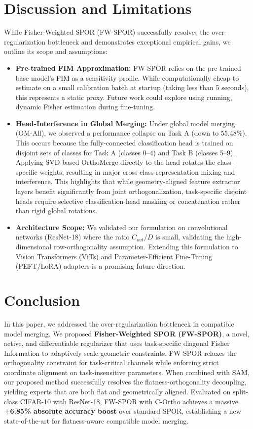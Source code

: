 \documentclass{article}
\theoremstyle{plain}
\theoremstyle{definition}
\theoremstyle{remark}
\begin{document}
\section{Discussion and Limitations}
\label{sec:discussion}

While Fisher-Weighted SPOR (FW-SPOR) successfully resolves the over-regularization bottleneck and demonstrates exceptional empirical gains, we outline its scope and assumptions:
\begin{itemize}
    \item \textbf{Pre-trained FIM Approximation:} FW-SPOR relies on the pre-trained base model's FIM as a sensitivity profile. While computationally cheap to estimate on a small calibration batch at startup (taking less than 5 seconds), this represents a static proxy. Future work could explore using running, dynamic Fisher estimation during fine-tuning.
    \item \textbf{Head-Interference in Global Merging:} Under global model merging (OM-All), we observed a performance collapse on Task A (down to 55.48\%). This occurs because the fully-connected classification head is trained on disjoint sets of classes for Task A (classes 0--4) and Task B (classes 5--9). Applying SVD-based OrthoMerge directly to the head rotates the class-specific weights, resulting in major cross-class representation mixing and interference. This highlights that while geometry-aligned feature extractor layers benefit significantly from joint orthogonalization, task-specific disjoint heads require selective classification-head masking or concatenation rather than rigid global rotations.
    \item \textbf{Architecture Scope:} We validated our formulation on convolutional networks (ResNet-18) where the ratio $C_{out}/D$ is small, validating the high-dimensional row-orthogonality assumption. Extending this formulation to Vision Transformers (ViTs) and Parameter-Efficient Fine-Tuning (PEFT/LoRA) adapters is a promising future direction.
\end{itemize}

\section{Conclusion}
\label{sec:conclusion}

In this paper, we addressed the over-regularization bottleneck in compatible model merging. We proposed \textbf{Fisher-Weighted SPOR (FW-SPOR)}, a novel, active, and differentiable regularizer that uses task-specific diagonal Fisher Information to adaptively scale geometric constraints. FW-SPOR relaxes the orthogonality constraint for task-critical channels while enforcing strict coordinate alignment on task-insensitive parameters. When combined with SAM, our proposed method successfully resolves the flatness-orthogonality decoupling, yielding experts that are both flat and geometrically aligned. Evaluated on split-class CIFAR-10 with ResNet-18, FW-SPOR with C-Ortho achieves a massive \textbf{+6.85\% absolute accuracy boost} over standard SPOR, establishing a new state-of-the-art for flatness-aware compatible model merging.

\nocite{*}


\end{document}
